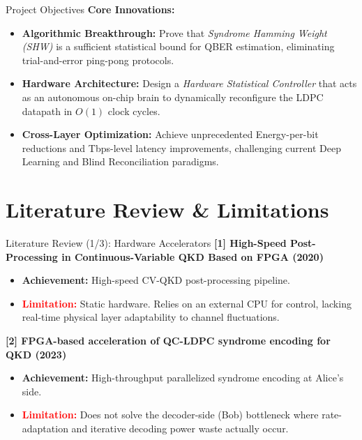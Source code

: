 \documentclass[t, aspectratio=169]{beamer}
\begin{document}
	\begin{frame}{Project Objectives}
        \textbf{Core Innovations:}
        \begin{itemize}
            \item \textbf{Algorithmic Breakthrough:} Prove that \textit{Syndrome Hamming Weight (SHW)} is a sufficient statistical bound for QBER estimation, eliminating trial-and-error ping-pong protocols.
            \vspace{0.8em}
            \item \textbf{Hardware Architecture:} Design a \textit{Hardware Statistical Controller} that acts as an autonomous on-chip brain to dynamically reconfigure the LDPC datapath in $O(1)$ clock cycles.
            \vspace{0.8em}
            \item \textbf{Cross-Layer Optimization:} Achieve unprecedented Energy-per-bit reductions and Tbps-level latency improvements, challenging current Deep Learning and Blind Reconciliation paradigms.
        \end{itemize}
	\end{frame}
	
	\section{Literature Review \& Limitations}
	
	\begin{frame}{Literature Review (1/3): Hardware Accelerators}
        \textbf{[1] High-Speed Post-Processing in Continuous-Variable QKD Based on FPGA (2020)}
        \begin{itemize}
            \item \textbf{Achievement:} High-speed CV-QKD post-processing pipeline.
            \item \textcolor{red}{\textbf{Limitation:}} Static hardware. Relies on an external CPU for control, lacking real-time physical layer adaptability to channel fluctuations.
        \end{itemize}
        \vspace{0.8em}
        \textbf{[2] FPGA-based acceleration of QC-LDPC syndrome encoding for QKD (2023)}
        \begin{itemize}
            \item \textbf{Achievement:} High-throughput parallelized syndrome encoding at Alice's side.
            \item \textcolor{red}{\textbf{Limitation:}} Does not solve the decoder-side (Bob) bottleneck where rate-adaptation and iterative decoding power waste actually occur.
        \end{itemize}
	\end{frame}
\end{document}
